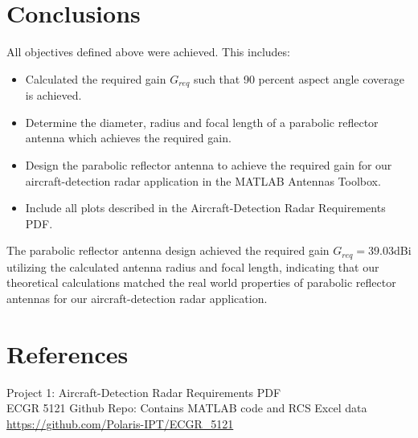 \documentclass[a4paper]{article}
\begin{document}
\section{Conclusions}
	All objectives defined above were achieved. This includes:
	\begin{itemize}
		\item Calculated the required gain $G_{req}$ such that 90 percent aspect angle coverage is achieved.
		\item Determine the diameter, radius and focal length of a parabolic reflector antenna which achieves the required gain.
		\item Design the parabolic reflector antenna to achieve the required gain for our aircraft-detection radar application in the MATLAB Antennas Toolbox.
		\item Include all plots described in the Aircraft-Detection Radar Requirements PDF. 
	\end{itemize}
	The parabolic reflector antenna design achieved the required gain $G_{req} = 39.03$dBi utilizing the calculated antenna radius and focal length, indicating that our theoretical calculations matched the real world properties of parabolic reflector antennas for our aircraft-detection radar application.
	
\section{References}
    Project 1: Aircraft-Detection Radar Requirements PDF \\
    ECGR 5121 Github Repo: Contains MATLAB code and RCS Excel data \\
    \url{https://github.com/Polaris-IPT/ECGR_5121}
\end{document}
